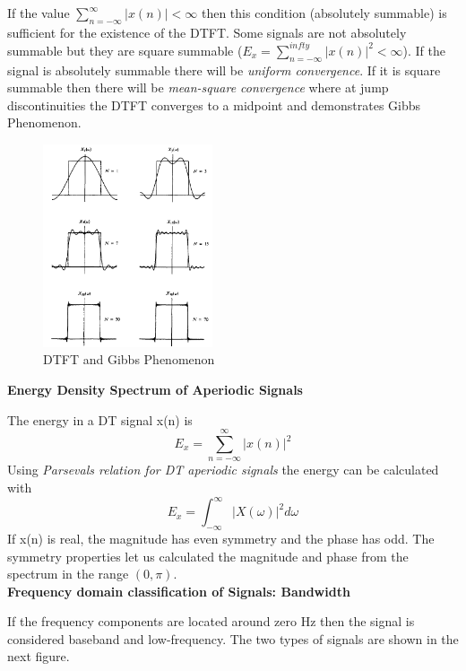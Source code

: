 \documentclass{article} %
\begin{document}
	If the value $\sum_{n=-\infty}^{\infty}|x(n)| < \infty$ then this condition (absolutely summable) is sufficient for the existence of the DTFT. Some
	signals are not absolutely summable but they are square summable ($E_x = \sum_{n=-\infty}^{infty}|x(n)|^2 < \infty$). If the signal is
	absolutely summable there will be \textit{uniform convergence}. If it is square summable then there will be \textit{mean-square convergence}
	where at jump discontinuities the DTFT converges to a midpoint and demonstrates Gibbs Phenomenon.
	\begin{figure}[h]
	\centering
	\includegraphics[width=5cm]{gibbs}
	\caption{DTFT and Gibbs Phenomenon}
	\end{figure}
	\textbf{Energy Density Spectrum of Aperiodic Signals}

	The energy in a DT signal x(n) is 
	\begin{equation}
	E_x = \sum_{n = -\infty}^{\infty}|x(n)|^2
	\end{equation}
	Using \textit{Parsevals relation for DT aperiodic signals} the energy can be calculated with
	\begin{equation}
	E_x = \int_{-\infty}^{\infty}|X(\omega)|^2d\omega
	\end{equation}
	If x(n) is real, the magnitude has even symmetry and the phase has odd. The symmetry properties let us calculated the magnitude and phase
	from the spectrum in the range $(0, \pi)$. \\
	\textbf{Frequency domain classification of Signals: Bandwidth}

	If the frequency components are located around zero Hz then the signal is considered baseband and low-frequency. The two types of signals
	are shown in the next figure. 
\end{document}
